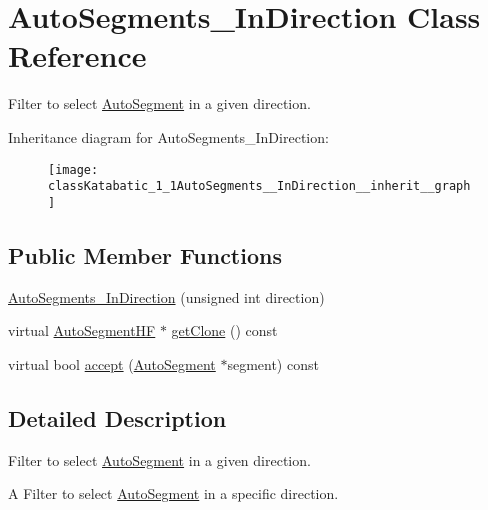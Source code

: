 \hypertarget{classKatabatic_1_1AutoSegments__InDirection}{\section{Auto\-Segments\-\_\-\-In\-Direction Class Reference}
\label{classKatabatic_1_1AutoSegments__InDirection}
}


Filter to select \hyperlink{classKatabatic_1_1AutoSegment}{Auto\-Segment} in a given direction.  




Inheritance diagram for Auto\-Segments\-\_\-\-In\-Direction\-:\nopagebreak
\begin{figure}[H]
\begin{center}
\leavevmode
\texttt{[image: classKatabatic\_1\_1AutoSegments\_\_InDirection\_\_inherit\_\_graph]}
\end{center}
\end{figure}
\subsection*{Public Member Functions}
\begin{DoxyCompactItemize}
\item 
\hyperlink{classKatabatic_1_1AutoSegments__InDirection_ad51ecb756fa52e994c47dffcdb21c136}{Auto\-Segments\-\_\-\-In\-Direction} (unsigned int direction)
\item 
virtual \hyperlink{namespaceKatabatic_a790418bb65a9a13859868df3e8f53598}{Auto\-Segment\-H\-F} $\ast$ \hyperlink{classKatabatic_1_1AutoSegments__InDirection_afcbca92b72aff15ded94fe7c815de1ff}{get\-Clone} () const 
\item 
virtual bool \hyperlink{classKatabatic_1_1AutoSegments__InDirection_a9e516170369269efd0277930871bfa6b}{accept} (\hyperlink{classKatabatic_1_1AutoSegment}{Auto\-Segment} $\ast$segment) const 
\end{DoxyCompactItemize}


\subsection{Detailed Description}
Filter to select \hyperlink{classKatabatic_1_1AutoSegment}{Auto\-Segment} in a given direction. 

A Filter to select \hyperlink{classKatabatic_1_1AutoSegment}{Auto\-Segment} in a specific direction. 


